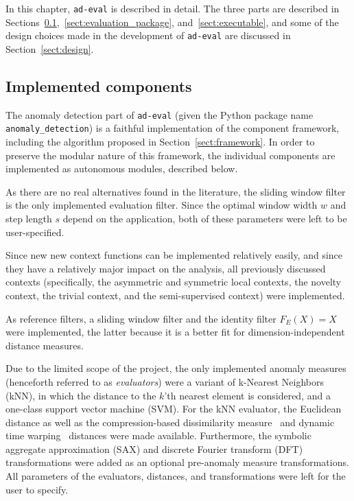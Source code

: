 In this chapter, \texttt{ad-eval} is described in detail. The three parts are described in Sections~\ref{sect:implemented_problems},~\ref{sect:evaluation_package}, and~\ref{sect:executable}, and some of the design choices made in the development of \texttt{ad-eval} are discussed in Section~\ref{sect:design}.

\subsection{Implemented components}
\label{sect:implemented_problems}

The anomaly detection part of \texttt{ad-eval} (given the Python package name \texttt{anomaly\_detection}) is a faithful implementation of the component framework, including the algorithm proposed in Section~\ref{sect:framework}. In order to preserve the modular nature of this framework, the individual components are implemented as autonomous modules, described below.

As there are no real alternatives found in the literature, the sliding window filter is the only implemented evaluation filter. Since the optimal window width $w$ and step length $s$ depend on the application, both of these parameters were left to be user-specified.

Since new new context functions can be implemented relatively easily, and since they have a relatively major impact on the analysis, all previously discussed contexts (specifically, the asymmetric and symmetric local contexts, the novelty context, the trivial context, and the semi-supervised context) were implemented.

As reference filters, a sliding window filter and the identity filter $F_E(X)=X$ were implemented, the latter because it is a better fit for dimension-independent distance measures.

Due to the limited scope of the project, the only implemented anomaly measures (henceforth referred to as \emph{evaluators}) were a variant of k-Nearest Neighbors (kNN), in which the distance to the $k$'th nearest element is considered, and a one-class support vector machine (SVM). For the kNN evaluator, the Euclidean distance as well as the compression-based dissimilarity measure~\cite{keogh2} and dynamic time warping~\cite{dtw} distances were made available. Furthermore, the symbolic aggregate approximation (SAX) and discrete Fourier transform (DFT) transformations were added as an optional pre-anomaly measure transformations. All parameters of the evaluators, distances, and transformations were left for the user to specify.

